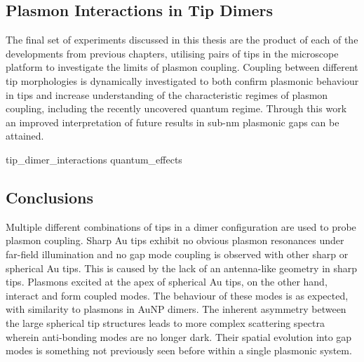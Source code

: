 \documentclass[12pt, a4paper, twoside]{book}
\begin{document}
\begin{singlespace}
\color{white}\chapter{Plasmon Interactions in Tip Dimers}
\label{ch:tip_interactions}
\end{singlespace}


The final set of experiments discussed in this thesis are the product of each of the developments from previous chapters, utilising pairs of tips in the microscope platform to investigate the limits of plasmon coupling. Coupling between different tip morphologies is dynamically investigated to both confirm plasmonic behaviour in tips and increase understanding of the characteristic regimes of plasmon coupling, including the recently uncovered quantum regime. Through this work an improved interpretation of future results in sub-nm plasmonic gaps can be attained.

{tip_dimer_interactions}
{quantum_effects}

\section{Conclusions}

Multiple different combinations of tips in a dimer configuration are used to probe plasmon coupling. Sharp Au tips exhibit no obvious plasmon resonances under far-field illumination and no gap mode coupling is observed with other sharp or spherical Au tips. This is caused by the lack of an antenna-like geometry in sharp tips. Plasmons excited at the apex of spherical Au tips, on the other hand, interact and form coupled modes. The behaviour of these modes is as expected, with similarity to plasmons in AuNP dimers. The inherent asymmetry between the large spherical tip structures leads to more complex scattering spectra wherein anti-bonding modes are no longer dark. Their spatial evolution into gap modes is something not previously seen before within a single plasmonic system.
\end{document}
